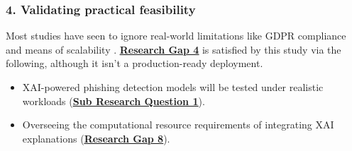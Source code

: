 
\subsubsection*{4. Validating practical feasibility}
Most studies have seen to ignore real-world limitations like GDPR compliance and means of scalability \citep{kapoor2024comparative}. \hyperref[research-gap-4]{\uline{\textbf{Research Gap 4}}} is satisfied by this study via the following, although it isn't a production-ready deployment.

\begin{itemize}
  \item XAI-powered phishing detection models will be tested under realistic workloads (\hyperref[sub-research-q1]{\uline{\textbf{Sub Research Question 1}}}).
  \item Overseeing the computational resource requirements of integrating XAI explanations (\hyperref[research-gap-8]{\uline{\textbf{Research Gap 8}}}).
\end{itemize}
